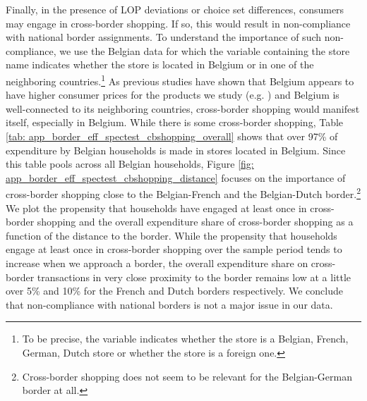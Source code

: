 Finally, in the presence of LOP deviations or choice set differences, consumers may engage in cross-border shopping. If so, this would result in non-compliance with national border assignments. To understand the importance of such non-compliance, we use the Belgian data for which the variable containing the store name indicates whether the store is located in Belgium or in one of the neighboring countries.\footnote{To be precise, the variable indicates whether the store is a Belgian, French, German, Dutch store or whether the store is a foreign one.} As previous studies have shown that Belgium appears to have higher consumer prices for the products we study (e.g. \citet{Beck2020}) and Belgium is well-connected to its neighboring countries, cross-border shopping would manifest itself, especially in Belgium. While there is some cross-border shopping, Table \ref{tab: app_border_eff_spectest_cbshopping_overall} shows that over 97\% of expenditure by Belgian households is made in stores located in Belgium. Since this table pools across all Belgian households, Figure \ref{fig: app_border_eff_spectest_cbshopping_distance} focuses on the importance of cross-border shopping close to the Belgian-French and the Belgian-Dutch border.\footnote{Cross-border shopping does not seem to be relevant for the Belgian-German border at all.} We plot the propensity that households have engaged at least once in cross-border shopping and the overall expenditure share of cross-border shopping as a function of the distance to the border. While the propensity that households engage at least once in cross-border shopping over the sample period tends to increase when we approach a border, the overall expenditure share on cross-border transactions in very close proximity to the border remains low at a little over 5\% and 10\% for the French and Dutch borders respectively. We conclude that non-compliance with national borders is not a major issue in our data. 

